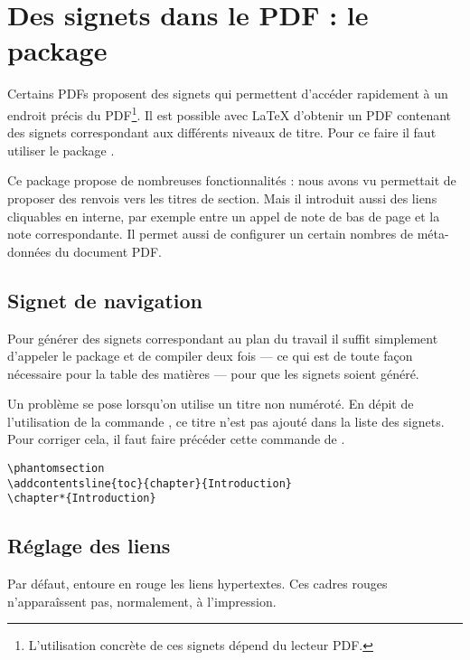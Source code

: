 \section{Des signets dans le PDF : le package }\label{hyperref}


Certains PDFs proposent des signets qui permettent d'accéder rapidement à un endroit précis du PDF\footnote{L'utilisation concrète de ces signets dépend du lecteur PDF.}. Il est possible avec \LaTeX{} d'obtenir un PDF contenant des signets correspondant aux différents niveaux de titre. Pour ce faire il faut utiliser le package .

Ce package propose de nombreuses fonctionnalités :  nous avons vu  permettait de proposer des renvois vers les titres de section.
Mais il introduit aussi des liens cliquables en interne, par exemple entre un appel de note de bas de page et la note correspondante. Il permet aussi de configurer un certain nombres de méta-données du document PDF.

\subsection{Signet de navigation}

Pour générer des signets correspondant au plan du travail il suffit simplement d'appeler le package et de compiler deux fois --- ce qui est de toute façon nécessaire pour la table des matières --- pour que les signets soient généré.

Un problème se pose lorsqu'on utilise un titre non numéroté. En dépit de l'utilisation de la commande , ce titre n'est pas ajouté dans la liste des signets. Pour corriger cela, il faut faire précéder cette commande de .

\begin{verbatim}
\phantomsection
\addcontentsline{toc}{chapter}{Introduction}
\chapter*{Introduction}
\end{verbatim}

\subsection{Réglage des liens}
Par défaut,  entoure en rouge les liens hypertextes. Ces cadres rouges n'apparaîssent pas, normalement, à l'impression.

